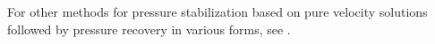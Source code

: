 \documentclass[onecolumn, twoside, a4paper, 11pt]{article}
\begin{document}
For other methods for pressure stabilization based on pure velocity solutions
followed by pressure recovery in various forms, see
\cite{Akhtar2009ser,Caiazzo2014niv,Baiges2013ero}.



\end{document}
